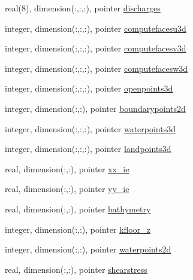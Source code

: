 \begin{DoxyCompactItemize}
\item 
real(8), dimension(\+:,\+:,\+:), pointer \mbox{\hyperlink{structmodulewaterproperties_1_1t__external_aa36bb12667e67b9bf9950a731b3c11c6}{discharges}}
\item 
integer, dimension(\+:,\+:,\+:), pointer \mbox{\hyperlink{structmodulewaterproperties_1_1t__external_a29c60e5b204cc36a19ae3593104f800d}{computefacesu3d}}
\item 
integer, dimension(\+:,\+:,\+:), pointer \mbox{\hyperlink{structmodulewaterproperties_1_1t__external_a16acb6a9f63592dd2b64cacaa09e8502}{computefacesv3d}}
\item 
integer, dimension(\+:,\+:,\+:), pointer \mbox{\hyperlink{structmodulewaterproperties_1_1t__external_ae6138ea1af12e1de63e96d2751b5eacf}{computefacesw3d}}
\item 
integer, dimension(\+:,\+:,\+:), pointer \mbox{\hyperlink{structmodulewaterproperties_1_1t__external_a8cf34309581b34f0d406d4a7b747f98a}{openpoints3d}}
\item 
integer, dimension(\+:,\+:), pointer \mbox{\hyperlink{structmodulewaterproperties_1_1t__external_a4d333ce9a40ba90952517bfecdb9cf72}{boundarypoints2d}}
\item 
integer, dimension(\+:,\+:,\+:), pointer \mbox{\hyperlink{structmodulewaterproperties_1_1t__external_a73a6df5658c3f5748959980429d980ba}{waterpoints3d}}
\item 
integer, dimension(\+:,\+:,\+:), pointer \mbox{\hyperlink{structmodulewaterproperties_1_1t__external_a8f025ccf252063b4dfa05f80f5745e68}{landpoints3d}}
\item 
real, dimension(\+:,\+:), pointer \mbox{\hyperlink{structmodulewaterproperties_1_1t__external_a9543bbb77231563baac4d15f39e4cc3f}{xx\+\_\+ie}}
\item 
real, dimension(\+:,\+:), pointer \mbox{\hyperlink{structmodulewaterproperties_1_1t__external_ad66096f8ba9ee8db99d5bae6531a805f}{yy\+\_\+ie}}
\item 
real, dimension(\+:,\+:), pointer \mbox{\hyperlink{structmodulewaterproperties_1_1t__external_a8183f37014304c9621f31d8ef57c36b4}{bathymetry}}
\item 
integer, dimension(\+:,\+:), pointer \mbox{\hyperlink{structmodulewaterproperties_1_1t__external_a277999acbbb483b6778dd1b94f0339d1}{kfloor\+\_\+z}}
\item 
integer, dimension(\+:,\+:), pointer \mbox{\hyperlink{structmodulewaterproperties_1_1t__external_ad0c1920e2c8cafe09081389e70d53b03}{waterpoints2d}}
\item 
real, dimension(\+:,\+:), pointer \mbox{\hyperlink{structmodulewaterproperties_1_1t__external_a9fd523716dfdc2a44485eae297b85a50}{shearstress}}

\end{DoxyCompactItemize}
